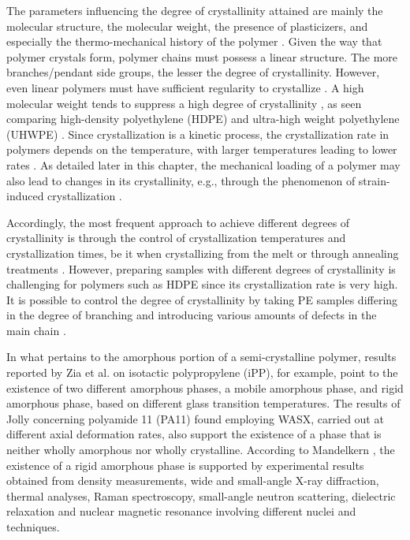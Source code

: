 The parameters influencing the degree of crystallinity attained are mainly the molecular structure, the molecular weight, the presence of plasticizers, and especially the thermo-mechanical history of the polymer \citep{khouryMorphologyCrystallineSynthetic1976, cangemiTwoPhaseModelMechanical2001}.
Given the way that polymer crystals form, polymer chains must possess a linear structure.
The more branches/pendant side groups, the lesser the degree of crystallinity.
However, even linear polymers must have sufficient regularity to crystallize \citep{khouryMorphologyCrystallineSynthetic1976}.
A high molecular weight tends to suppress a high degree of crystallinity \citep{hoffmanAnalysisRelaxationsPolychlorotrifluoroethylene2007}, as seen comparing high-density polyethylene (HDPE) and ultra-high weight polyethylene (UHWPE) \citep{brownInfluenceMolecularConformation2007}.
Since crystallization is a kinetic process, the crystallization rate in polymers depends on the temperature, with larger temperatures leading to lower rates \citep{callister2014materials}.
As detailed later in this chapter, the mechanical loading of a polymer may also lead to changes in its crystallinity, e.g., through the phenomenon of strain-induced crystallization \citep{raoStudyStraininducedCrystallization2001}.

Accordingly, the most frequent approach to achieve different degrees of crystallinity is through the control of crystallization temperatures and crystallization times, be it when crystallizing from the melt or through annealing treatments \citep{fakirovGlassTransitionTemperature2000, schrauwenIntrinsicDeformationBehavior2004}.
However, preparing samples with different degrees of crystallinity is challenging for polymers such as HDPE since its crystallization rate is very high.
It is possible to control the degree of crystallinity by taking PE samples differing in the degree of branching and introducing various amounts of defects in the main chain \citep{fakirovGlassTransitionTemperature2000}.

In what pertains to the amorphous portion of a semi-crystalline polymer, results reported by Zia et al. \citep{ziaRigidAmorphousFraction2008} on isotactic polypropylene (iPP), for example, point to the existence of two different amorphous phases, a mobile amorphous phase, and rigid amorphous phase, based on different glass transition temperatures.
The results of Jolly \citep{jollyAnalyseMicrostructurePolyamide2000} concerning polyamide 11 (PA11) found employing WASX, carried out at different axial deformation rates, also support the existence of a phase that is neither wholly amorphous nor wholly crystalline.
According to Mandelkern \citep{mandelkernCrystallinePolymerReminiscences2006}, the existence of a rigid amorphous phase is supported by experimental results obtained from density measurements, wide and small-angle X-ray diffraction, thermal analyses, Raman spectroscopy, small-angle neutron scattering, dielectric relaxation and nuclear magnetic resonance involving different nuclei and techniques.

